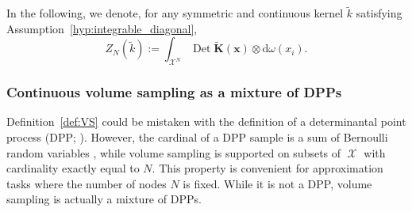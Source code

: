\documentclass[twoside,11pt]{book}
\newtheorem{definition}{Definition}
\DeclareMathOperator{\Det}{Det}
\DeclareMathOperator{\DPP}{\mathrm{DPP}}
\DeclareMathOperator{\Prb}{\mathbb{P}}
\DeclareMathOperator*{\KDPP}{\mathfrak{K}}
\DeclareMathOperator{\X}{\mathcal{X}}
\newcommand{\rb}[1]{\textcolor{magenta}{#1}}
\begin{document}
In the following, we denote, for any symmetric and continuous kernel $\tilde{k}$ satisfying Assumption~\ref{hyp:integrable_diagonal},
\begin{equation}
Z_{N}(\tilde{k}) := \int_{\X^{N}} \Det \bm{\tilde{K}}(\bm{x}) \otimes\mathrm{d}\omega(x_{i}).
\end{equation}



\subsubsection{Continuous volume sampling as a mixture of DPPs}


Definition~\ref{def:VS} could be mistaken with the definition of a determinantal point process (DPP; \citealp{Mac75}). However, the cardinal of a DPP sample is a sum of Bernoulli random variables \citep{HoKrPeVi06}, while volume sampling is supported on subsets of $\X$ with cardinality exactly equal to $N$. This property is convenient for approximation tasks where the number of nodes $N$ is fixed. While it is not a DPP, volume sampling is actually a mixture of DPPs.


\end{document}
